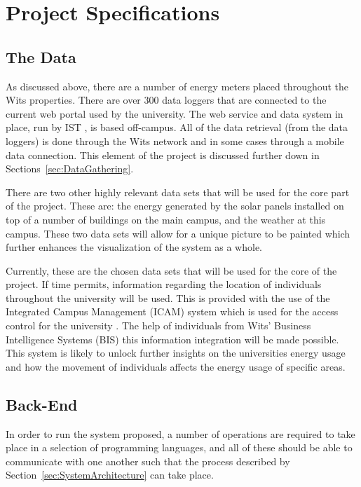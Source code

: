 \documentclass[12pt,onecolumn]{IEEEtran}
\begin{document}
\section{Project Specifications}

\subsection{The Data} \label{sec:TheData}
As discussed above, there are a number of energy meters placed throughout the Wits properties. There are over 300 data loggers that are connected to the current web portal used by the university. 
The web service and data system in place, run by IST \cite{IST}, is based off-campus. %
All of the data retrieval (from the data loggers) is done through the Wits network and in some cases through a mobile data connection. This element of the project is discussed further down in Sections~\ref{sec:DataGathering}. 

There are two other highly relevant data sets that will be used for the core part of the project. These are: the energy generated by the solar panels installed on top of a number of buildings on the main campus, and the weather at this campus. 
These two data sets will allow for a unique picture to be painted which further enhances the visualization of the system as a whole. 

Currently, these are the chosen data sets that will be used for the core of the project. If time permits, information regarding the location of individuals throughout the university will be used. This is provided with the use of the Integrated Campus Management (ICAM) system which is used for the access control for the university \cite{icam}. The help of individuals from Wits' Business Intelligence Systems (BIS) this information integration will be made possible.
This system is likely to unlock further insights on the universities energy usage and how the movement of individuals affects the energy usage of specific areas. 


\subsection{Back-End} \label{sec:BackEnd}
In order to run the system proposed, a number of operations are required to take place in a selection of programming languages, and all of these should be able to communicate with one another such that the process described by Section~\ref{sec:SystemArchitecture} can take place. 
\end{document}
